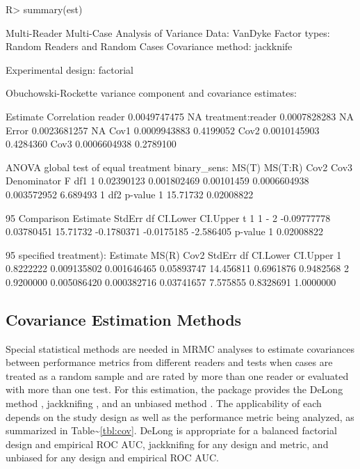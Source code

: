 \documentclass[
]{jss}
\begin{document}
\begin{CodeChunk}
\begin{CodeInput}
R> summary(est)
\end{CodeInput}
\begin{CodeOutput}
Multi-Reader Multi-Case Analysis of Variance
Data: VanDyke
Factor types: Random Readers and Random Cases
Covariance method: jackknife

Experimental design: factorial 

Obuchowski-Rockette variance component and covariance estimates:

                     Estimate Correlation
reader           0.0049747475          NA
treatment:reader 0.0007828283          NA
Error            0.0023681257          NA
Cov1             0.0009943883   0.4199052
Cov2             0.0010145903   0.4284360
Cov3             0.0006604938   0.2789100


ANOVA global test of equal treatment binary_sens:
       MS(T)     MS(T:R)       Cov2         Cov3 Denominator        F df1
1 0.02390123 0.001802469 0.00101459 0.0006604938 0.003572952 6.689493   1
       df2    p-value
1 15.71732 0.02008822


95%
  Comparison    Estimate     StdErr       df   CI.Lower   CI.Upper         t
1      1 - 2 -0.09777778 0.03780451 15.71732 -0.1780371 -0.0175185 -2.586405
     p-value
1 0.02008822


95%
specified treatment):
   Estimate       MS(R)        Cov2     StdErr        df  CI.Lower  CI.Upper
1 0.8222222 0.009135802 0.001646465 0.05893747 14.456811 0.6961876 0.9482568
2 0.9200000 0.005086420 0.000382716 0.03741657  7.575855 0.8328691 1.0000000
\end{CodeOutput}
\end{CodeChunk}

\hypertarget{covariance-estimation-methods}{%
\subsection{Covariance Estimation
Methods}\label{covariance-estimation-methods}}

Special statistical methods are needed in MRMC analyses to estimate
covariances between performance metrics from different readers and tests
when cases are treated as a random sample and are rated by more than one
reader or evaluated with more than one test. For this estimation, the
package provides the DeLong method \citep{DeLong:1988:CAU}, jackknifing
\citep{Efron:1982:JBR}, and an unbiased method \citep{Gallas:2007:MMV}.
The applicability of each depends on the study design as well as the
performance metric being analyzed, as summarized in
Table\textasciitilde{}\ref{tbl:cov}. DeLong is appropriate for a
balanced factorial design and empirical ROC AUC, jackknifing for any
design and metric, and unbiased for any design and empirical ROC AUC.
\end{document}
